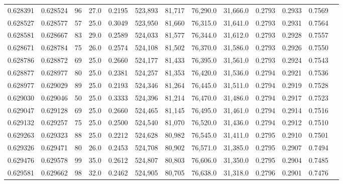 \begin{tabular}{rrrrrrrrrrrrr}
0.628391 & 0.628524 &    96 & 27.0 &                                     0.2195 & 523,893 &  81,717 &  76,290.0 &  31,666.0 & 0.2793 & 0.2933 & 0.7569 \\
0.628527 & 0.628577 &    57 & 25.0 &                                     0.3049 & 523,950 &  81,660 &  76,315.0 &  31,641.0 & 0.2793 & 0.2931 & 0.7564 \\
0.628581 & 0.628667 &    83 & 29.0 &                                     0.2589 & 524,033 &  81,577 &  76,344.0 &  31,612.0 & 0.2793 & 0.2928 & 0.7557 \\
0.628671 & 0.628784 &    75 & 26.0 &                                     0.2574 & 524,108 &  81,502 &  76,370.0 &  31,586.0 & 0.2793 & 0.2926 & 0.7550 \\
0.628786 & 0.628872 &    69 & 25.0 &                                     0.2660 & 524,177 &  81,433 &  76,395.0 &  31,561.0 & 0.2793 & 0.2924 & 0.7543 \\
0.628877 & 0.628977 &    80 & 25.0 &                                     0.2381 & 524,257 &  81,353 &  76,420.0 &  31,536.0 & 0.2794 & 0.2921 & 0.7536 \\
0.628977 & 0.629029 &    89 & 25.0 &                                     0.2193 & 524,346 &  81,264 &  76,445.0 &  31,511.0 & 0.2794 & 0.2919 & 0.7528 \\
0.629030 & 0.629046 &    50 & 25.0 &                                     0.3333 & 524,396 &  81,214 &  76,470.0 &  31,486.0 & 0.2794 & 0.2917 & 0.7523 \\
0.629047 & 0.629128 &    69 & 25.0 &                                     0.2660 & 524,465 &  81,145 &  76,495.0 &  31,461.0 & 0.2794 & 0.2914 & 0.7516 \\
0.629132 & 0.629257 &    75 & 25.0 &                                     0.2500 & 524,540 &  81,070 &  76,520.0 &  31,436.0 & 0.2794 & 0.2912 & 0.7510 \\
0.629263 & 0.629323 &    88 & 25.0 &                                     0.2212 & 524,628 &  80,982 &  76,545.0 &  31,411.0 & 0.2795 & 0.2910 & 0.7501 \\
0.629326 & 0.629471 &    80 & 26.0 &                                     0.2453 & 524,708 &  80,902 &  76,571.0 &  31,385.0 & 0.2795 & 0.2907 & 0.7494 \\
0.629476 & 0.629578 &    99 & 35.0 &                                     0.2612 & 524,807 &  80,803 &  76,606.0 &  31,350.0 & 0.2795 & 0.2904 & 0.7485 \\
0.629581 & 0.629662 &    98 & 32.0 &                                     0.2462 & 524,905 &  80,705 &  76,638.0 &  31,318.0 & 0.2796 & 0.2901 & 0.7476 \\

\end{tabular}
